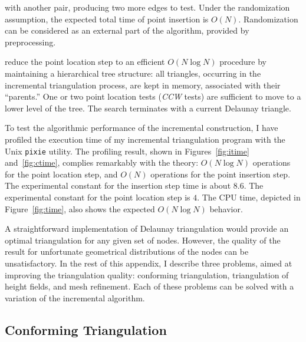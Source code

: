 with another pair, producing two more edges to test. Under the
randomization assumption, the expected total time of point insertion
is $O (N)$.  Randomization can be considered as an external part of
the algorithm, provided by preprocessing.
\par
\cite{knuth} reduce the point location step to an efficient $O (N
\log N)$ procedure by maintaining a hierarchical tree structure: all
triangles, occurring in the incremental triangulation process, are
kept in memory, associated with their ``parents.'' One or two point
location tests (\emph{CCW} tests) are sufficient to move to a lower
level of the tree. The search terminates with a current Delaunay
triangle.
\par
To test the algorithmic performance of the incremental construction, I
have profiled the execution time of my incremental triangulation
program with the Unix \texttt{pixie} utility. The profiling result,
shown in Figures~\ref{fig:itime} and~\ref{fig:ctime}, complies
remarkably with the theory: $O (N \log N)$ operations for the point
location step, and $O (N)$ operations for the point insertion step.
The experimental constant for the insertion step time is about $8.6$.
The experimental constant for the point location step is $4$.  The CPU
time, depicted in Figure~\ref{fig:time}, also shows the expected $O (N
\log N)$ behavior.




\par
A straightforward implementation of Delaunay triangulation would
provide an optimal triangulation for any given set of nodes. However,
the quality of the result for unfortunate geometrical
distributions of the nodes can be unsatisfactory. In the rest of this
appendix, I describe three problems, aimed at improving the
triangulation quality: conforming triangulation, triangulation of
height fields, and mesh refinement.  Each of these problems can be
solved with a variation of the incremental algorithm.

\subsection{Conforming Triangulation}

